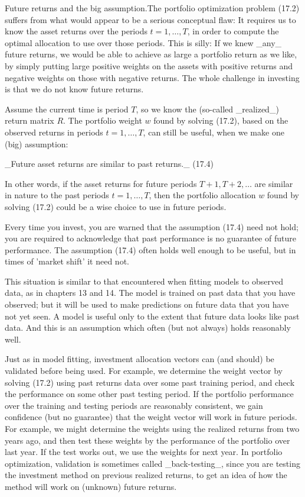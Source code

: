 Future returns and the big assumption.The portfolio optimization problem (17.2) suffers from what would appear to be a serious conceptual flaw: It requires us to know the asset returns over the periods \(t=1,\ldots,T\), in order to compute the optimal allocation to use over those periods. This is silly: If we knew _any_ future returns, we would be able to achieve as large a portfolio return as we like, by simply putting large positive weights on the assets with positive returns and negative weights on those with negative returns. The whole challenge in investing is that we do not know future returns.

Assume the current time is period \(T\), so we know the (so-called _realized_) return matrix \(R\). The portfolio weight \(w\) found by solving (17.2), based on the observed returns in periods \(t=1,\ldots,T\), can still be useful, when we make one (big) assumption:

_Future asset returns are similar to past returns._ (17.4)

In other words, if the asset returns for future periods \(T+1,T+2,\ldots\) are similar in nature to the past periods \(t=1,\ldots,T\), then the portfolio allocation \(w\) found by solving (17.2) could be a wise choice to use in future periods.

Every time you invest, you are warned that the assumption (17.4) need not hold; you are required to acknowledge that past performance is no guarantee of future performance. The assumption (17.4) often holds well enough to be useful, but in times of 'market shift' it need not.

This situation is similar to that encountered when fitting models to observed data, as in chapters 13 and 14. The model is trained on past data that you have observed; but it will be used to make predictions on future data that you have not yet seen. A model is useful only to the extent that future data looks like past data. And this is an assumption which often (but not always) holds reasonably well.

Just as in model fitting, investment allocation vectors can (and should) be validated before being used. For example, we determine the weight vector by solving (17.2) using past returns data over some past training period, and check the performance on some other past testing period. If the portfolio performance over the training and testing periods are reasonably consistent, we gain confidence (but no guarantee) that the weight vector will work in future periods. For example, we might determine the weights using the realized returns from two years ago, and then test these weights by the performance of the portfolio over last year. If the test works out, we use the weights for next year. In portfolio optimization, validation is sometimes called _back-testing_, since you are testing the investment method on previous realized returns, to get an idea of how the method will work on (unknown) future returns.

